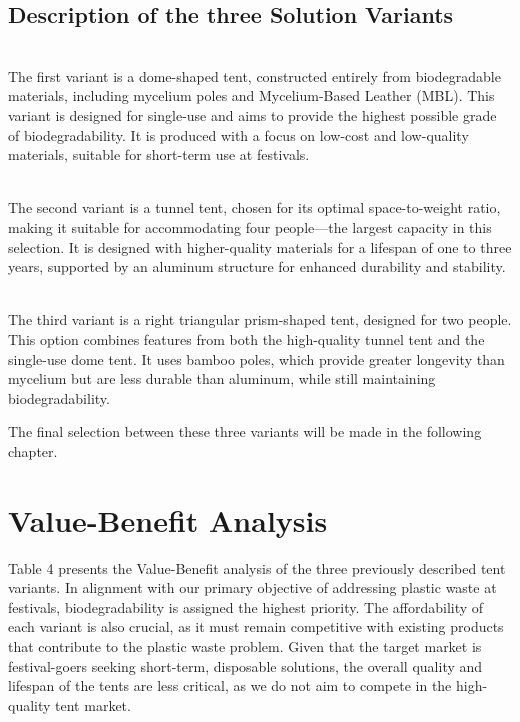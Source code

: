 \documentclass{article}
\begin{document}
\newpage
\subsection{Description of the three Solution Variants}
{\color{darkgreen}{Variant 1: Dome Tent (Single-Use, Fully Biodegradable)}}\\
The first variant is a dome-shaped tent, constructed entirely from biodegradable materials,
including mycelium poles and Mycelium-Based Leather (MBL). This variant is designed for
single-use and aims to provide the highest possible grade of biodegradability. It is produced
with a focus on low-cost and low-quality materials, suitable for short-term use at festivals.

{\color{orange}{Variant 2: Tunnel Tent (Four-Person, Long-Lasting)}}\\
The second variant is a tunnel tent, chosen for its optimal space-to-weight ratio, making it
suitable for accommodating four people—the largest capacity in this selection. It is designed
with higher-quality materials for a lifespan of one to three years, supported by an aluminum
structure for enhanced durability and stability.

{\color{blue}{Variant 3: Triangular Prism Tent (Two-Person, Medium-Lasting)}}\\
The third variant is a right triangular prism-shaped tent, designed for two people. This option
combines features from both the high-quality tunnel tent and the single-use dome tent. It
uses bamboo poles, which provide greater longevity than mycelium but are less durable
than aluminum, while still maintaining biodegradability.

The final selection between these three variants will be made in the following chapter.

\section{Value-Benefit Analysis}
Table 4 presents the Value-Benefit analysis of the three previously described tent variants. In
alignment with our primary objective of addressing plastic waste at festivals,
biodegradability is assigned the highest priority. The affordability of each variant is also
crucial, as it must remain competitive with existing products that contribute to the plastic
waste problem. Given that the target market is festival-goers seeking short-term, disposable
solutions, the overall quality and lifespan of the tents are less critical, as we do not aim to
compete in the high-quality tent market.
\end{document}
